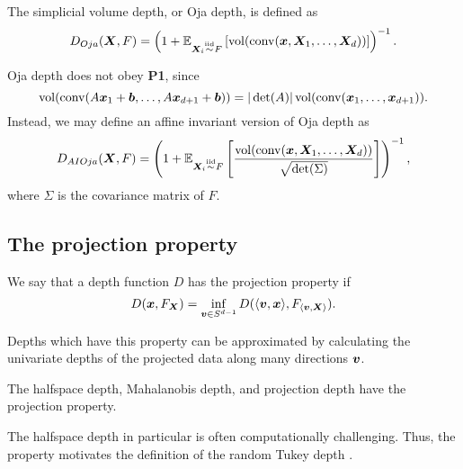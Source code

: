 \begin{definition}
    The simplicial volume depth, or Oja depth, is defined as
    \begin{equation}
        D_{Oja}(\bm{X}, F) = \left(1 + \operatorname{\mathbb{E}}_{\bm{X}_i \overset{\text{iid}}{\sim} F}\left[\operatorname{vol}(\operatorname{conv}(\bm{x}, \bm{X}_1, \dots, \bm{X}_d))\right]\right)^{-1}.
    \end{equation}
\end{definition}

\begin{remark}
    Oja depth does not obey \textbf{P1}, since
    \begin{equation}
        \operatorname{vol}(\operatorname{conv}(A\bm{x}_1 + \bm{b}, \dots, A\bm{x}_{d + 1} + \bm{b})) = |\det(A)| \operatorname{vol}(\operatorname{conv}(\bm{x}_1, \dots, \bm{x}_{d + 1})).
    \end{equation}
    Instead, we may define an affine invariant version of Oja depth as
    \begin{equation}
        D_{AIOja}(\bm{X}, F) = \left(1 + \operatorname{\mathbb{E}}_{\bm{X}_i \overset{\text{iid}}{\sim} F}\left[\frac{\operatorname{vol}(\operatorname{conv}(\bm{x}, \bm{X}_1, \dots, \bm{X}_d))}{\sqrt{\det(\Sigma)}}\right]\right)^{-1},
    \end{equation}
    where $\Sigma$ is the covariance matrix of $F$.
\end{remark}


\subsection{The projection property}


\begin{definition}
    We say that a depth function $D$ has the projection property if
    \begin{equation}
        D(\bm{x}, F_{\bm{X}}) = \inf_{\bm{v} \in S^{d - 1}} D(\langle \bm{v}, \bm{x} \rangle, F_{\langle \bm{v}, \bm{X} \rangle}).
    \end{equation}
\end{definition}

Depths which have this property can be approximated by calculating the
univariate depths of the projected data along many directions $\bm{v}$.


\begin{lemma}
    The halfspace depth, Mahalanobis depth, and projection depth have the
    projection property.
\end{lemma}

The halfspace depth in particular is often computationally challenging.
Thus, the property motivates the definition of the random Tukey depth
\parencite{albertos-reyes-2008a}.

